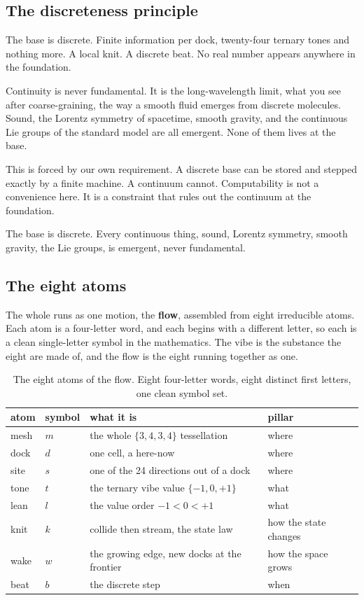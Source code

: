 \subsection{The discreteness principle}

The base is discrete. Finite information per dock, twenty-four ternary tones and nothing more. A local knit. A discrete beat. No real number appears anywhere in the foundation.

Continuity is never fundamental. It is the long-wavelength limit, what you see after coarse-graining, the way a smooth fluid emerges from discrete molecules. Sound, the Lorentz symmetry of spacetime, smooth gravity, and the continuous Lie groups of the standard model are all emergent. None of them lives at the base.

This is forced by our own requirement. A discrete base can be stored and stepped exactly by a finite machine. A continuum cannot. Computability is not a convenience here. It is a constraint that rules out the continuum at the foundation.

\begin{principle}[Discreteness]
The base is discrete. Every continuous thing, sound, Lorentz symmetry, smooth gravity, the Lie groups, is emergent, never fundamental.
\end{principle}

\subsection{The eight atoms}

The whole runs as one motion, the \textbf{flow}, assembled from eight irreducible atoms. Each atom is a four-letter word, and each begins with a different letter, so each is a clean single-letter symbol in the mathematics. The vibe is the substance the eight are made of, and the flow is the eight running together as one.

\begin{table}[ht]
\centering
\begin{tabular}{@{}llll@{}}
\toprule
atom & symbol & what it is & pillar \\
\midrule
mesh & $m$ & the whole $\{3,4,3,4\}$ tessellation & where \\
dock & $d$ & one cell, a here-now & where \\
site & $s$ & one of the 24 directions out of a dock & where \\
tone & $t$ & the ternary vibe value $\{-1,0,+1\}$ & what \\
lean & $l$ & the value order $-1 < 0 < +1$ & what \\
knit & $k$ & collide then stream, the state law & how the state changes \\
wake & $w$ & the growing edge, new docks at the frontier & how the space grows \\
beat & $b$ & the discrete step & when \\
\bottomrule
\end{tabular}
\caption{The eight atoms of the flow. Eight four-letter words, eight distinct first letters, one clean symbol set.}
\label{tab:atoms}
\end{table}


